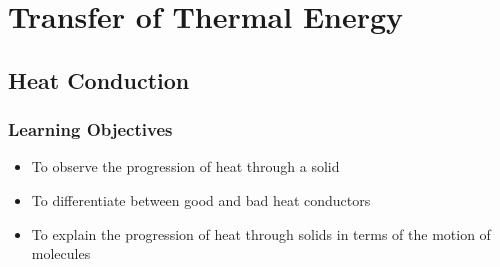 \section{Transfer of Thermal Energy}




\subsection{Heat Conduction}

\subsubsection*{Learning Objectives}
\begin{itemize}
\item{To observe the progression of heat through a solid} 
\item{To differentiate between good and bad heat conductors} 
\item{To explain the progression of heat through solids in terms of the motion of molecules} 
\end{itemize}


